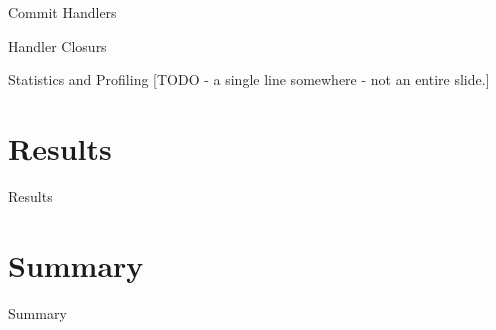 \documentclass[]{beamer}
\begin{document}
\begin{frame}{Commit Handlers}
\end{frame}

\begin{frame}{Handler Closurs}
\end{frame}

\begin{frame}{Statistics and Profiling}
[TODO - a single line somewhere - not an entire slide.]
\end{frame}

\section{Results}

\begin{frame}{Results}
\end{frame}

\section{Summary}

\begin{frame}{Summary}
\end{frame}
\end{document}
